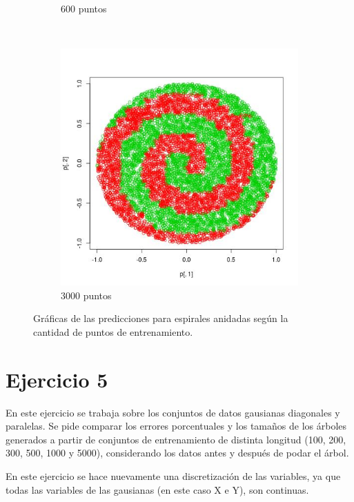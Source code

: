 \documentclass[12pt, a4paper]{article}
\begin{document}
\begin{figure}
\begin{subfigure}[b]{0.45\textwidth}
        \caption{600 puntos}
    \end{subfigure}
    ~ %
    \begin{subfigure}[b]{0.45\textwidth}
        \includegraphics[width=\textwidth]{espirales3000}
        \caption{3000 puntos}
    \end{subfigure}
    \caption{Gráficas de las predicciones para espirales anidadas según la cantidad de puntos de entrenamiento.}
\end{figure}


\section*{Ejercicio 5}
 En este ejercicio se trabaja sobre los conjuntos de datos gausianas diagonales y paralelas. Se pide comparar los errores porcentuales y los tamaños de los árboles generados a partir de conjuntos de entrenamiento de distinta longitud (100, 200, 300, 500, 1000 y 5000), considerando los datos antes y después de podar el árbol.

\bigskip

En este ejercicio se hace nuevamente una discretización de las variables, ya que todas las variables de las gausianas (en este caso X e Y), son continuas.
\end{document}
